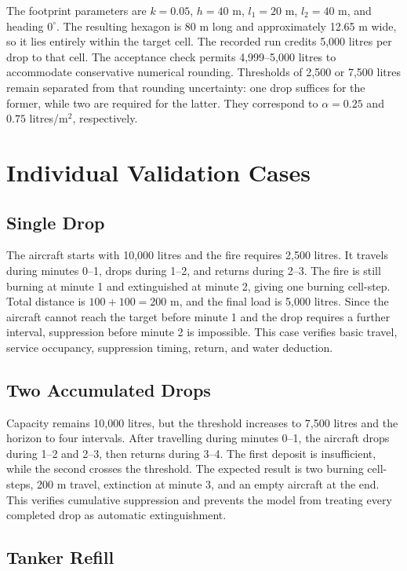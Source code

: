 The footprint parameters are $k=0.05$, $h=40$ m, $l_1=20$ m, $l_2=40$ m, and heading $0^\circ$. The resulting hexagon is 80 m long and approximately 12.65 m wide, so it lies entirely within the target cell. The recorded run credits 5,000 litres per drop to that cell. The acceptance check permits 4,999--5,000 litres to accommodate conservative numerical rounding. Thresholds of 2,500 or 7,500 litres remain separated from that rounding uncertainty: one drop suffices for the former, while two are required for the latter. They correspond to $\alpha=0.25$ and $0.75$ litres/m$^2$, respectively.

\section{Individual Validation Cases}
\label{sec:validation-cases}

\subsection{Single Drop}

The aircraft starts with 10,000 litres and the fire requires 2,500 litres. It travels during minutes 0--1, drops during 1--2, and returns during 2--3. The fire is still burning at minute 1 and extinguished at minute 2, giving one burning cell-step. Total distance is $100+100=200$ m, and the final load is 5,000 litres. Since the aircraft cannot reach the target before minute 1 and the drop requires a further interval, suppression before minute 2 is impossible. This case verifies basic travel, service occupancy, suppression timing, return, and water deduction.

\subsection{Two Accumulated Drops}

Capacity remains 10,000 litres, but the threshold increases to 7,500 litres and the horizon to four intervals. After travelling during minutes 0--1, the aircraft drops during 1--2 and 2--3, then returns during 3--4. The first deposit is insufficient, while the second crosses the threshold. The expected result is two burning cell-steps, 200 m travel, extinction at minute 3, and an empty aircraft at the end. This verifies cumulative suppression and prevents the model from treating every completed drop as automatic extinguishment.

\subsection{Tanker Refill}

